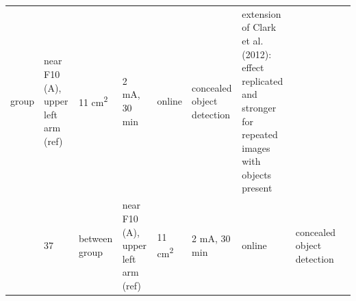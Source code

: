 \documentclass[11pt,english,]{memoir}
\begin{document}
\begin{longtable}[]{@{}lllllllll@{}}
\begin{minipage}[t]{0.05\columnwidth}
group\strut
\end{minipage} & \begin{minipage}[t]{0.15\columnwidth}\raggedright
near F10 (A), upper left arm
(ref)\strut
\end{minipage} & \begin{minipage}[t]{0.04\columnwidth}\raggedright
11
cm\textsuperscript{2}\strut
\end{minipage} & \begin{minipage}[t]{0.06\columnwidth}\raggedright
2 mA, 30
min\strut
\end{minipage} & \begin{minipage}[t]{0.05\columnwidth}\raggedright
online\strut
\end{minipage} & \begin{minipage}[t]{0.06\columnwidth}\raggedright
concealed
object
detection\strut
\end{minipage} & \begin{minipage}[t]{0.25\columnwidth}\raggedright
extension of Clark et al. (2012): effect
replicated and stronger for repeated images with
objects present\strut
\end{minipage}\tabularnewline
\begin{minipage}[t]{0.08\columnwidth}\raggedright
\textcite{Falcone2012}\strut
\end{minipage} & \begin{minipage}[t]{0.03\columnwidth}\raggedright
37\strut
\end{minipage} & \begin{minipage}[t]{0.05\columnwidth}\raggedright
between
group\strut
\end{minipage} & \begin{minipage}[t]{0.15\columnwidth}\raggedright
near F10 (A), upper left arm
(ref)\strut
\end{minipage} & \begin{minipage}[t]{0.04\columnwidth}\raggedright
11
cm\textsuperscript{2}\strut
\end{minipage} & \begin{minipage}[t]{0.06\columnwidth}\raggedright
2 mA, 30
min\strut
\end{minipage} & \begin{minipage}[t]{0.05\columnwidth}\raggedright
online\strut
\end{minipage} & \begin{minipage}[t]{0.06\columnwidth}\raggedright
concealed
object
detection\strut
\end{minipage} & \begin{minipage}[t]{0.25\columnwidth}\raggedright

\end{minipage}
\end{longtable}
\end{document}
